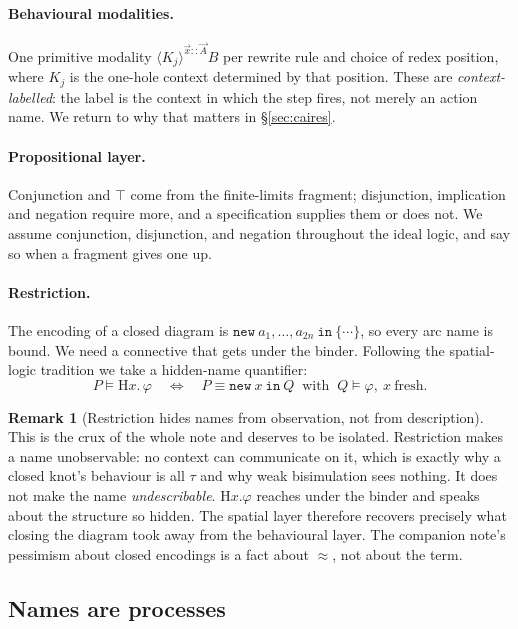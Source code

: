 \documentclass[11pt]{article}
\theoremstyle{definition}
\newtheorem{remark}{Remark}
\newcommand{\wbisim}{\approx}
\newcommand{\Hq}{\mathrm{H}}
\begin{document}
\paragraph{Behavioural modalities.}
One primitive modality $\langle K_j\rangle^{\vec x :: \vec A}B$ per rewrite rule
and choice of redex position, where $K_j$ is the one-hole context determined by
that position. These are \emph{context-labelled}: the label is the context in
which the step fires, not merely an action name. We return to why that matters in
\S\ref{sec:caires}.

\paragraph{Propositional layer.}
Conjunction and $\top$ come from the finite-limits fragment; disjunction,
implication and negation require more, and a specification supplies them or does
not. We assume conjunction, disjunction, and negation throughout the ideal logic,
and say so when a fragment gives one up.

\paragraph{Restriction.}
The encoding of a closed diagram is $\mathtt{new}\ a_1,\dots,a_{2n}\ \mathtt{in}\
\{\cdots\}$, so every arc name is bound. We need a connective that gets under the
binder. Following the spatial-logic tradition we take a hidden-name quantifier:
\[
P \models \Hq x.\,\varphi
\quad\Longleftrightarrow\quad
P \equiv \mathtt{new}\ x\ \mathtt{in}\ Q \ \text{ with } \ Q \models \varphi,
\ x \ \text{fresh}.
\]

\begin{remark}[Restriction hides names from observation, not from description]
\label{rem:crux}
This is the crux of the whole note and deserves to be isolated. Restriction makes
a name unobservable: no context can communicate on it, which is exactly why a
closed knot's behaviour is all $\tau$ and why weak bisimulation sees nothing. It
does not make the name \emph{undescribable}. $\Hq x.\varphi$ reaches under the
binder and speaks about the structure so hidden. The spatial layer therefore
recovers precisely what closing the diagram took away from the behavioural layer.
The companion note's pessimism about closed encodings is a fact about
$\wbisim$, not about the term.
\end{remark}

\subsection{Names are processes}\label{sec:names}
\end{document}
